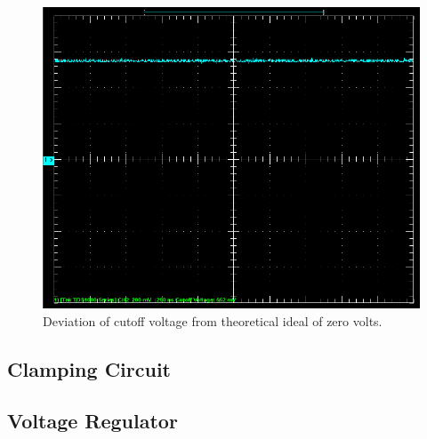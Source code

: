 \documentclass[twocolumn,english]{IEEEtran}
\begin{document}
\begin{figure}[H]
  \begin{centering}
  \begin{center}
  \includegraphics[width=\linewidth]{./Cutoff_Voltage.png}
  \caption{Deviation of cutoff voltage from theoretical ideal of zero volts.}
  \label{fig:cutoff_voltage}
  \end{center}
  \par\end{centering}
  \end{figure}





\subsection{\textbf{Clamping Circuit}}





\subsection{\textbf{Voltage Regulator}}
\end{document}
